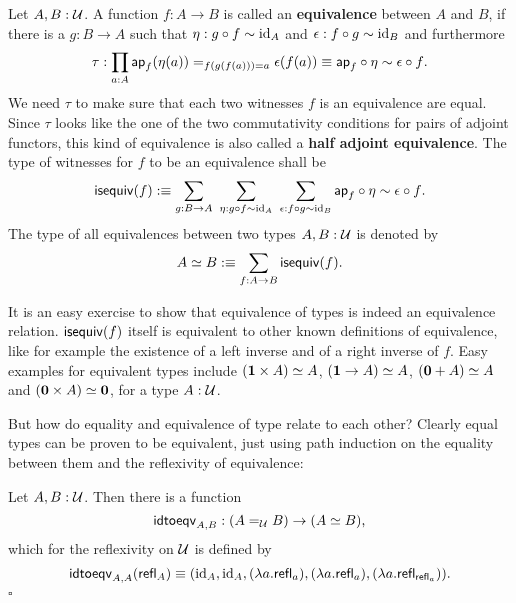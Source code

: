 \begin{defn}[Equivalences] \label{def:ishae-hott}
Let $A, B : \mathcal{U}$. A function $f : A \to B$ is called an \textbf{equivalence}
between $A$ and $B$, if there is a $g : B \to A$ such that
$\eta : g \circ f \sim \operatorname{id}_A$ and $\epsilon : f \circ g \sim \operatorname{id}_B$ and furthermore
\begin{equation*}
\tau : \prod_{a : A} \mathsf{ap}_f(\eta(a)) =_{f(g(f(a)))=a} \epsilon(f(a)) 
 \equiv \mathsf{ap}_f \circ \eta \sim \epsilon \circ f \text{.}
\end{equation*}
We need $\tau$ to make sure that each two witnesses $f$ is an equivalence are
equal.
Since $\tau$ looks like the one of the two commutativity conditions for pairs
of adjoint functors, this kind of equivalence is also called a \textbf{half
adjoint equivalence}.
The type of witnesses for $f$ to be an equivalence shall be
\begin{equation*}
\mathsf{isequiv}(f) :\equiv \sum_{g : B \to A} ~ \sum_{\eta : g \circ f \sim \operatorname{id}_A} ~
\sum_{\epsilon : f \circ g \sim \operatorname{id}_B} \mathsf{ap}_f \circ \eta \sim \epsilon \circ f \text{.}
\end{equation*}
The type of all equivalences between two types $A, B : \mathcal{U}$ is denoted by
\begin{equation*}
A \simeq B :\equiv \sum_{f : A \to B} \mathsf{isequiv}(f) \text{.}
\end{equation*}
\end{defn}

It is an easy exercise to show that equivalence of types is indeed an equivalence
relation. $\mathsf{isequiv}(f)$ itself is equivalent to other known definitions of equivalence,
like for example the existence of a left inverse and of a right inverse of $f$.
Easy examples for equivalent types include $(\mathbf{1} \times A) \simeq A$,
$(\mathbf{1} \to A) \simeq A$, $(\mathbf{0} + A) \simeq A$ and
$(\mathbf{0} \times A) \simeq \mathbf{0}$, for a type $A : \mathcal{U}$.

But how do equality and equivalence of type relate to each other?
Clearly equal types can be proven to be equivalent, just using path induction
on the equality between them and the reflexivity of equivalence:
\begin{lemma} \label{thm:idtoeqv-hott}
Let $A, B : \mathcal{U}$. Then there is a function
\begin{equation*}
\mathsf{idtoeqv}_{A, B} : (A =_{\mathcal{U}} B) \to (A \simeq B) \text{,}
\end{equation*}
which for the reflexivity on $\mathcal{U}$ is defined by
\begin{equation*}
\mathsf{idtoeqv}_{A,A} (\mathsf{refl}_A) \equiv (\operatorname{id}_A, \operatorname{id}_A, (\lambda a. \mathsf{refl}_a), (\lambda a. \mathsf{refl}_a),
(\lambda a. \mathsf{refl}_{\mathsf{refl}_a})) \text{.}
\end{equation*}
\hfill $\square$
\end{lemma}

